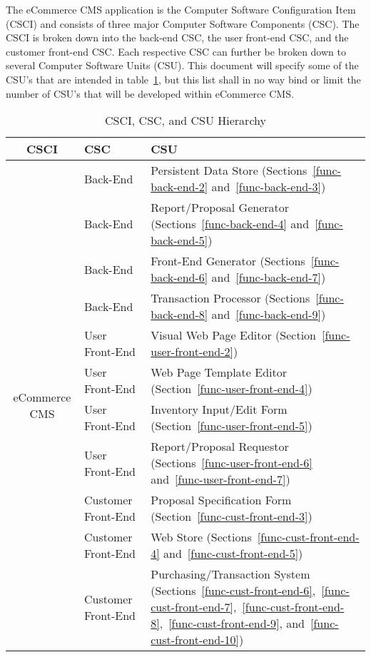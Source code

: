 \documentclass{article}
\begin{document}
The eCommerce CMS application is the Computer Software Configuration Item
(CSCI) and consists of three major Computer Software Components (CSC).  The
CSCI is broken down into the back-end CSC, the user front-end CSC, and the
customer front-end CSC.  Each respective CSC can further be broken down to
several Computer Software Units (CSU).  This document will specify some of the
CSU's that are intended in table~\ref{software-hierarchy}, but this list shall
in no way bind or limit the number of CSU's that will be developed within
eCommerce CMS.

\begin{table}
    \begin{tabular}{|c|l|p{8.5cm}|}\hline
        CSCI & CSC & CSU \\\hline\hline
        \multirow{12}{*}{eCommerce CMS}
         & Back-End & Persistent Data Store (Sections~\ref{func-back-end-2} and~\ref{func-back-end-3}) \\\cline{2-3}
         & Back-End & Report/Proposal Generator (Sections~\ref{func-back-end-4} and~\ref{func-back-end-5}) \\\cline{2-3}
         & Back-End & Front-End Generator (Sections~\ref{func-back-end-6} and~\ref{func-back-end-7}) \\\cline{2-3}
         & Back-End & Transaction Processor (Sections~\ref{func-back-end-8} and~\ref{func-back-end-9}) \\\cline{2-3}
         & User Front-End & Visual Web Page Editor (Section~\ref{func-user-front-end-2}) \\\cline{2-3}
         & User Front-End & Web Page Template Editor (Section~\ref{func-user-front-end-4}) \\\cline{2-3}
         & User Front-End & Inventory Input/Edit Form (Section~\ref{func-user-front-end-5}) \\\cline{2-3}
         & User Front-End & Report/Proposal Requestor (Sections~\ref{func-user-front-end-6} and~\ref{func-user-front-end-7}) \\\cline{2-3}
         & Customer Front-End & Proposal Specification Form (Section~\ref{func-cust-front-end-3}) \\\cline{2-3}
         & Customer Front-End & Web Store (Sections~\ref{func-cust-front-end-4} and~\ref{func-cust-front-end-5}) \\\cline{2-3}
         & Customer Front-End & Purchasing/Transaction System (Sections~\ref{func-cust-front-end-6},~\ref{func-cust-front-end-7},~\ref{func-cust-front-end-8},~\ref{func-cust-front-end-9}, and~\ref{func-cust-front-end-10}) \\\hline
    \end{tabular}
    \caption{CSCI, CSC, and CSU Hierarchy}
    \label{software-hierarchy}
\end{table}
\end{document}
